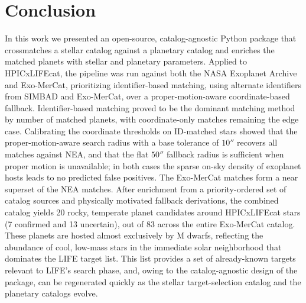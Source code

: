 \section{Conclusion}
In this work we presented an open-source, catalog-agnostic Python package that crossmatches a stellar catalog against a planetary catalog and enriches the matched planets with stellar and planetary parameters. Applied to HPICxLIFEcat, the pipeline was run against both the NASA Exoplanet Archive and Exo-MerCat, prioritizing identifier-based matching, using alternate identifiers from SIMBAD and Exo-MerCat, over a proper-motion-aware coordinate-based fallback.
Identifier-based matching proved to be the dominant matching method by number of matched planets, with coordinate-only matches remaining the edge case. Calibrating the coordinate thresholds on ID-matched stars showed that the proper-motion-aware search radius with a base tolerance of $10''$ recovers all matches against NEA, and that the flat $50''$ fallback radius is sufficient when proper motion is unavailable; in both cases the sparse on-sky density of exoplanet hosts leads to no predicted false positives. The Exo-MerCat matches form a near superset of the NEA matches.
After enrichment from a priority-ordered set of catalog sources and physically motivated fallback derivations, the combined catalog yields 20 rocky, temperate planet candidates around HPICxLIFEcat stars (7 confirmed and 13 uncertain), out of 83 across the entire Exo-MerCat catalog. These planets are hosted almost exclusively by M dwarfs, reflecting the abundance of cool, low-mass stars in the immediate solar neighborhood that dominates the LIFE target list. This list provides a set of already-known targets relevant to LIFE's search phase, and, owing to the catalog-agnostic design of the package, can be regenerated quickly as the stellar target-selection catalog and the planetary catalogs evolve.
